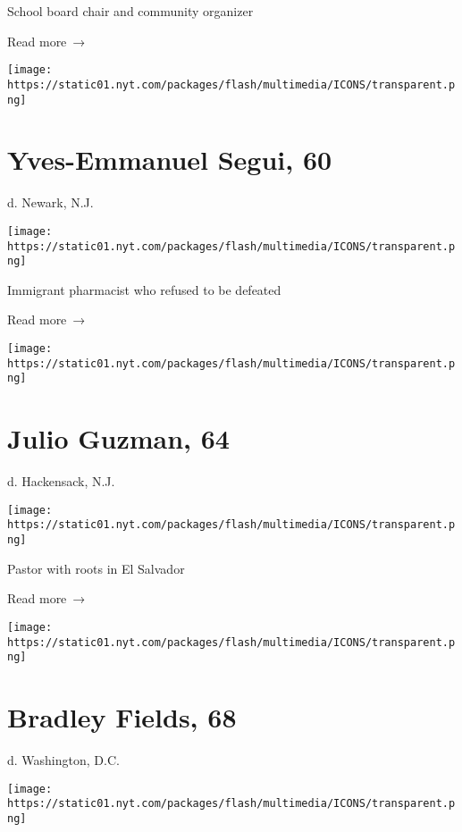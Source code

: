 School board chair and community organizer

 Read more~→

\href{https://www.nytimes.com/2020/06/10/obituaries/yves-emmanuel-segui-dead-coronavirus.html}{}

\texttt{[image: https://static01.nyt.com/packages/flash/multimedia/ICONS/transparent.png]}

\hypertarget{yves-emmanuel-segui-60}{%
\section{Yves-Emmanuel Segui, 60}\label{yves-emmanuel-segui-60}}

d. Newark, N.J.

\texttt{[image: https://static01.nyt.com/packages/flash/multimedia/ICONS/transparent.png]}

Immigrant pharmacist who refused to be defeated

 Read more~→

\href{https://www.nytimes.com/2020/06/09/obituaries/julio-guzman-dead-coronavirus.html}{}

\texttt{[image: https://static01.nyt.com/packages/flash/multimedia/ICONS/transparent.png]}

\hypertarget{julio-guzman-64}{%
\section{Julio Guzman, 64}\label{julio-guzman-64}}

d. Hackensack, N.J.

\texttt{[image: https://static01.nyt.com/packages/flash/multimedia/ICONS/transparent.png]}

Pastor with roots in El Salvador

 Read more~→

\href{https://www.nytimes.com/2020/06/08/obituaries/bradley-fields-dead-coronavirus.html}{}

\texttt{[image: https://static01.nyt.com/packages/flash/multimedia/ICONS/transparent.png]}

\hypertarget{bradley-fields-68}{%
\section{Bradley Fields, 68}\label{bradley-fields-68}}

d. Washington, D.C.

\texttt{[image: https://static01.nyt.com/packages/flash/multimedia/ICONS/transparent.png]}

